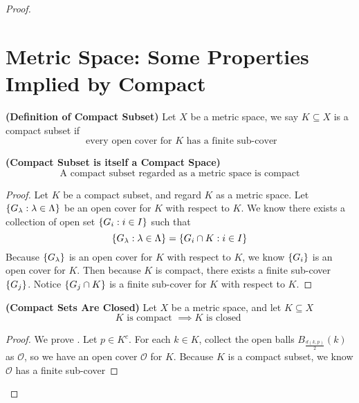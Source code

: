 \documentclass{report}
\begin{document}
\begin{proof}
\section{Metric Space: Some Properties Implied by Compact}
\begin{definition}
\label{1.11.1}
\textbf{(Definition of Compact Subset)} Let $X$ be a metric space, we say  $K\subseteq X$ is a compact subset if
\begin{equation}
\text{ every open cover for $K$ has a finite sub-cover}
\end{equation}
\end{definition}
\begin{theorem}
\label{1.11.2}
\textbf{(Compact Subset is itself a Compact Space)} 
\begin{equation}
\text{ A compact subset regarded as a metric space is compact }
\end{equation}
\end{theorem}
\begin{proof}
Let $K$ be a compact subset, and regard  $K$ as a metric space. Let $\{ G_\lambda :\lambda \in \Lambda  \}$ be an open cover for $K$ with respect to $K$. We know there exists a collection of open set $\{ G_i:i\in I \}$ such that 
\begin{equation}
\{ G_\lambda: \lambda  \in \Lambda \}=\{ G_i\cap K: i\in I \}
\end{equation}
Because $\{ G_\lambda  \}$ is an open cover for $K$ with respect to  $K$, we know  $\{ G_i \}$ is an open cover for $K$.  Then because $K$ is compact, there exists a finite sub-cover  $\{ G_j \}$. Notice $\{ G_j\cap K \}$ is a finite sub-cover for $K$ with respect to  $K$.
\end{proof}
\begin{theorem}
\label{1.11.3}
\textbf{(Compact Sets Are Closed)} Let $X$ be a metric space, and let $K\subseteq X$
\begin{equation}
K\text{ is compact }\implies K\text{ is closed }
\end{equation}
\end{theorem}
\begin{proof}
We prove  . Let $p\in K^c$. For each $k\in K$, collect the open balls $B_{\frac{d(k,p)}{2}}(k)$ as $\mathcal{O}$, so we have an open cover $\mathcal{O}$ for $K$. Because  $K$ is a compact subset, we know $\mathcal{O}$ has a finite sub-cover

\end{proof}
\end{proof}
\end{document}
